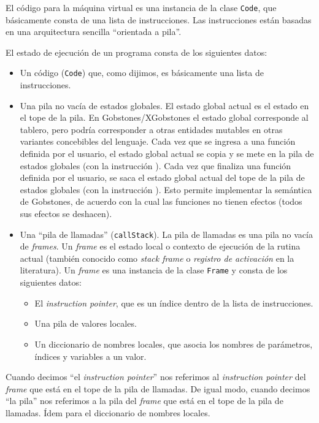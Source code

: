 \documentclass{article}
\begin{document}
El c\'odigo para la m\'aquina virtual es una instancia de la clase \texttt{Code},
que b\'asicamente consta de una lista de instrucciones. Las instrucciones est\'an
basadas en una arquitectura sencilla ``orientada a pila''.

El estado de ejecuci\'on de un programa consta de los siguientes datos:
\begin{itemize}
\item Un c\'odigo (\texttt{Code}) que, como dijimos, es b\'asicamente una lista de instrucciones.
\item Una pila no vac\'ia de estados globales.
      El estado global actual es el estado en el tope de la pila.
      En Gobstones/XGobstones el estado global corresponde al tablero,
      pero podr\'ia corresponder a otras entidades mutables en otras variantes
      concebibles del lenguaje.
      Cada vez que se ingresa a una funci\'on definida por el usuario,
      el estado global actual se copia y se mete en la pila de estados globales
      (con la instrucci\'on ).
      Cada vez que finaliza una funci\'on definida por el usuario,
      se saca el estado global actual del tope de la pila de estados globales
      (con la instrucci\'on ).
      Esto permite implementar la sem\'antica de Gobstones,
      de acuerdo con la cual las funciones no tienen efectos (todos sus efectos
      se deshacen).
\item Una ``pila de llamadas'' (\texttt{callStack}).
      La pila de llamadas es una pila no vac\'ia de {\em frames}.
      Un {\em frame} es el estado local
      o contexto de ejecuci\'on de la rutina actual (tambi\'en conocido como
      {\em stack frame} o {\em registro de activaci\'on} en la literatura).
      Un {\em frame} es una instancia de la
      clase \texttt{Frame} y consta de los siguientes datos:
      \begin{itemize}
      \item El {\em instruction pointer}, que es un \'indice dentro de la lista de instrucciones.
      \item Una pila de valores locales.
      \item Un diccionario de nombres locales, que asocia los nombres de
            par\'ametros, \'indices y variables a un valor.
      \end{itemize}
\end{itemize}
Cuando decimos ``el {\em instruction pointer}''
nos referimos al {\em instruction pointer} del {\em frame} que est\'a en el tope de la pila de llamadas.
De igual modo, cuando decimos ``la pila''
nos referimos a la pila del {\em frame} que est\'a en el tope de la pila de llamadas.
\'Idem para el diccionario de nombres locales.
\end{document}
